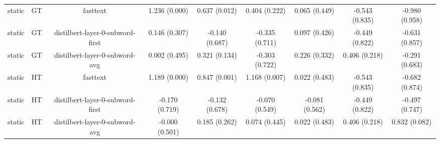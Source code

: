 \begin{sidewaystable}[htb]
\begin{tabular}{@{}ccccccccc@{}}
        static & GT & fasttext & 1.236 (0.000) & 0.637 (0.012) & 0.404 (0.222) & 0.065 (0.449) & -0.543 (0.835) & -0.980 (0.958) \\
        static & GT & distilbert-layer-0-subword-first & 0.146 (0.307) & -0.140 (0.687) & -0.335 (0.711) & 0.097 (0.426) & -0.449 (0.822) & -0.631 (0.857) \\
        static & GT & distilbert-layer-0-subword-avg & 0.002 (0.495) & 0.321 (0.134) & -0.303 (0.722) & 0.226 (0.332) & 0.406 (0.218) & -0.291 (0.683) \\
        static & HT & fasttext & 1.189 (0.000) & 0.847 (0.001) & 1.168 (0.007) & 0.022 (0.483) & -0.543 (0.835) & -0.682 (0.874) \\
        static & HT & distilbert-layer-0-subword-first & -0.170 (0.719) & -0.132 (0.678) & -0.070 (0.549) & -0.081 (0.562) & -0.449 (0.822) & -0.497 (0.747) \\
        static & HT & distilbert-layer-0-subword-avg & -0.000 (0.501) & 0.185 (0.262) & 0.074 (0.445) & 0.022 (0.483) & 0.406 (0.218) & 0.832 (0.082) \\
        \bottomrule
    \end{tabular}
\end{sidewaystable}